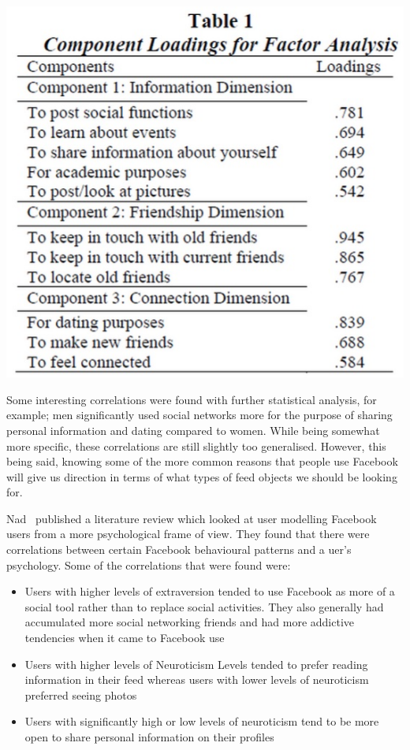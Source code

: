 \begin{center}
  \includegraphics{images/factoranalysis.jpg}
\end{center}

Some interesting correlations were found with further statistical analysis, for example; men significantly used social networks more for the purpose of sharing personal information and dating compared to women. While being somewhat more specific, these correlations are still slightly too generalised. However, this being said, knowing some of the more common reasons that people use Facebook will give us direction in terms of what types of feed objects we should be looking for.

Nad~\cite{nadkarni2012people} published a literature review which looked at user modelling Facebook users from a more psychological frame of view. They found that there were correlations between certain Facebook behavioural patterns and a uer's psychology. Some of the correlations that were found were:

\begin{itemize}
 \item Users with higher levels of extraversion tended to use Facebook as more of a social tool rather than to replace social activities. They also generally had accumulated more social networking friends  and had more addictive tendencies when it came to Facebook use 
 \item Users with higher levels of Neuroticism Levels tended to prefer reading information in their feed whereas users with lower levels of neuroticism preferred seeing photos
 \item Users with significantly high or low levels of neuroticism tend to be more open to share personal information on their profiles
\end{itemize}


